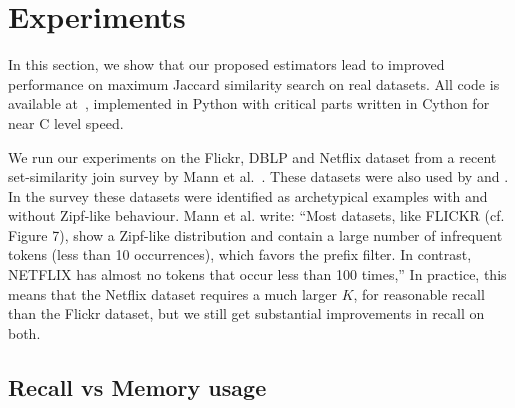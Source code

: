 
\section{Experiments}\label{sec:evaluation}

In this section, we show that our proposed estimators lead to improved performance on maximum
Jaccard similarity search on real datasets.
All code is available at~\cite{codes}, implemented in Python with critical parts written in Cython for near C level speed.

We run our experiments on the Flickr, DBLP and Netflix dataset from a recent set-similarity join survey by Mann et al.~\cite{mann2016empirical}.
These datasets were also used by \cite{christiani2018scalable} and \cite{ahle2020problem}.
In the survey these datasets were identified as archetypical examples with and without Zipf-like behaviour.
Mann et al. write:
 ``Most datasets, like FLICKR (cf. Figure 7), show a Zipf-like
 distribution and contain a large number of infrequent tokens (less
 than 10 occurrences), which favors the prefix filter. In contrast,
 NETFLIX has almost no tokens that occur less than 100 times,''
In practice, this means that the Netflix dataset requires a much larger $K$, for reasonable recall than the Flickr dataset, but we still get substantial improvements in recall on both.

\subsection{Recall vs Memory usage}





% 
% 

